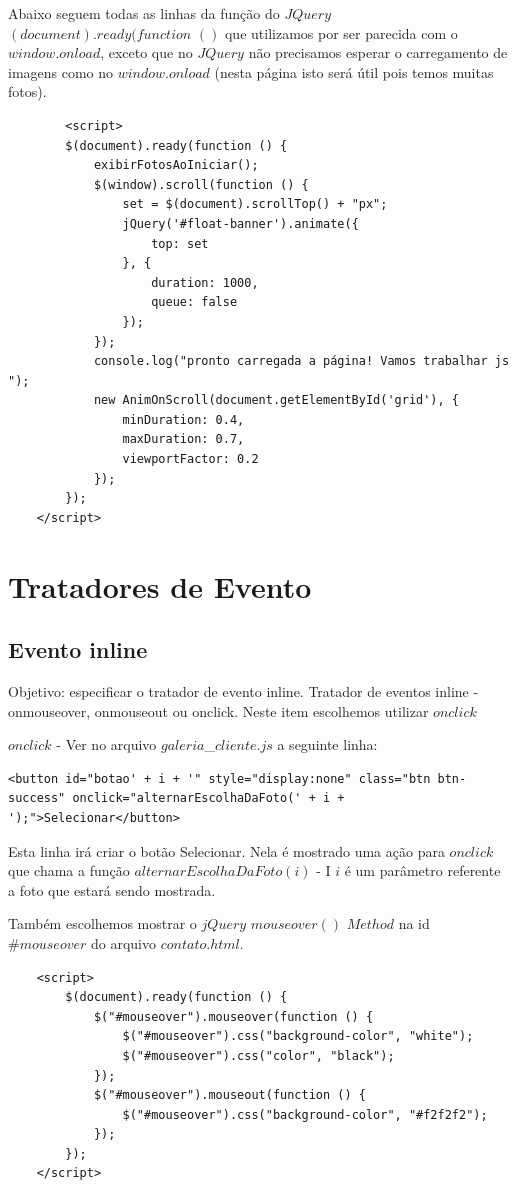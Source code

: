 	Abaixo seguem todas as linhas da função do $JQuery$ $(document).ready(function$ $()$ que utilizamos por ser parecida com o $window.onload$, exceto que no $JQuery$ não precisamos esperar o carregamento de imagens como no $window.onload$ (nesta página isto será útil pois temos muitas fotos).
	
		\begin{lstlisting}
	    <script>
        $(document).ready(function () {
            exibirFotosAoIniciar();
            $(window).scroll(function () {
                set = $(document).scrollTop() + "px";
                jQuery('#float-banner').animate({
                    top: set
                }, {
                    duration: 1000,
                    queue: false
                });
            });
            console.log("pronto carregada a página! Vamos trabalhar js ");
            new AnimOnScroll(document.getElementById('grid'), {
                minDuration: 0.4,
                maxDuration: 0.7,
                viewportFactor: 0.2
            });
        });
    </script>
	\end{lstlisting} 
  
  
\section{Tratadores de Evento}
\subsection{Evento inline}
Objetivo: especificar o tratador de evento inline. Tratador de eventos inline - onmouseover, onmouseout ou onclick. Neste item escolhemos utilizar $onclick$

$onclick$ - Ver no arquivo $galeria$\_$cliente.js$ a seguinte linha:

\begin{lstlisting}
<button id="botao' + i + '" style="display:none" class="btn btn-success" onclick="alternarEscolhaDaFoto(' + i + ');">Selecionar</button>
\end{lstlisting}

	Esta linha irá criar o botão Selecionar. Nela é mostrado uma ação para $onclick$ que chama a função $alternarEscolhaDaFoto(i)$ - I $i$ é um parâmetro referente a foto que estará sendo mostrada.
	
	Também escolhemos mostrar o $jQuery$ $mouseover()$ $Method$ na id $\#mouseover$ do arquivo $contato.html$.
\begin{lstlisting}		
    <script>
        $(document).ready(function () {
            $("#mouseover").mouseover(function () {
                $("#mouseover").css("background-color", "white");
                $("#mouseover").css("color", "black");
            });
            $("#mouseover").mouseout(function () {
                $("#mouseover").css("background-color", "#f2f2f2");
            });
        });
    </script>
\end{lstlisting}

